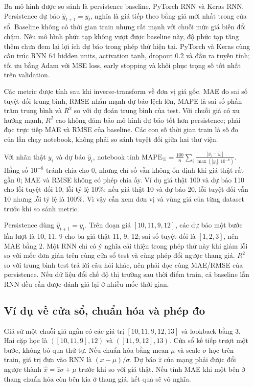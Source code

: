 \documentclass[12pt,a4paper]{report}
\begin{document}
Ba mô hình được so sánh là persistence baseline, PyTorch RNN và Keras RNN. Persistence dự báo $\hat y_{t+1}=y_t$, nghĩa là giá tiếp theo bằng giá mới nhất trong cửa sổ. Baseline không có thời gian train nhưng rất mạnh với chuỗi mức giá biến đổi chậm. Nếu mô hình phức tạp không vượt được baseline này, độ phức tạp tăng thêm chưa đem lại lợi ích dự báo trong phép thử hiện tại. PyTorch và Keras cùng cấu trúc RNN 64 hidden units, activation tanh, dropout 0.2 và đầu ra tuyến tính; tối ưu bằng Adam với MSE loss, early stopping và khôi phục trọng số tốt nhất trên validation.

Các metric được tính sau khi inverse-transform về đơn vị giá gốc. MAE đo sai số tuyệt đối trung bình, RMSE nhấn mạnh dự báo lệch lớn, MAPE là sai số phần trăm trung bình và $R^2$ so với dự đoán trung bình của test. Với chuỗi giá có xu hướng mạnh, $R^2$ cao không đảm bảo mô hình dự báo tốt hơn persistence; phải đọc trực tiếp MAE và RMSE của baseline. Các con số thời gian train là số đo của lần chạy notebook, không phải so sánh tuyệt đối giữa hai thư viện.

Với nhãn thật $y_i$ và dự báo $\hat y_i$, notebook tính $\mathrm{MAPE}_{\%}=\frac{100}{n}\sum_i\frac{|y_i-\hat y_i|}{\max(|y_i|,10^{-8})}$. Hằng số $10^{-8}$ tránh chia cho 0, nhưng chỉ số vẫn không ổn định khi giá thật rất gần 0; MAE và RMSE không có phép chia ấy. Ví dụ giá thật 100 và dự báo 110 cho lỗi tuyệt đối 10, lỗi tỷ lệ 10\%; nếu giá thật 10 và dự báo 20, lỗi tuyệt đối vẫn 10 nhưng lỗi tỷ lệ là 100\%. Vì vậy cần xem đơn vị và vùng giá của từng dataset trước khi so sánh metric.

Persistence dùng $\hat y_{t+1}=y_t$. Trên đoạn giá $[10,11,9,12]$, các dự báo một bước lần lượt là 10, 11, 9 cho ba giá thật 11, 9, 12; sai số tuyệt đối là $[1,2,3]$, nên MAE bằng 2. Một RNN chỉ có ý nghĩa cải thiện trong phép thử này khi giảm lỗi so với mốc đơn giản trên cùng cửa sổ test và cùng phép đổi ngược thang giá. $R^2$ so với trung bình test trả lời câu hỏi khác, nên phải đọc cùng MAE/RMSE của persistence. Nếu dữ liệu đổi chế độ thị trường sau thời điểm train, cả baseline lẫn RNN đều cần được đánh giá lại ở nhiều mốc thời gian.

\subsection{Ví dụ về cửa sổ, chuẩn hóa và phép đo}
Giả sử một chuỗi giá ngắn có các giá trị $[10,11,9,12,13]$ và lookback bằng 3. Hai cặp học là $([10,11,9],12)$ và $([11,9,12],13)$. Cửa sổ kế tiếp trượt một bước, không bỏ qua thứ tự. Nếu chuẩn hóa bằng mean $\mu$ và scale $\sigma$ học trên train, giá trị đưa vào RNN là $(x-\mu)/\sigma$. Dự báo $\hat z$ của mạng phải được đổi ngược thành $\hat x=\hat z\sigma+\mu$ trước khi so với giá thật. Nếu tính MAE khi một bên ở thang chuẩn hóa còn bên kia ở thang giá, kết quả sẽ vô nghĩa.
\end{document}
